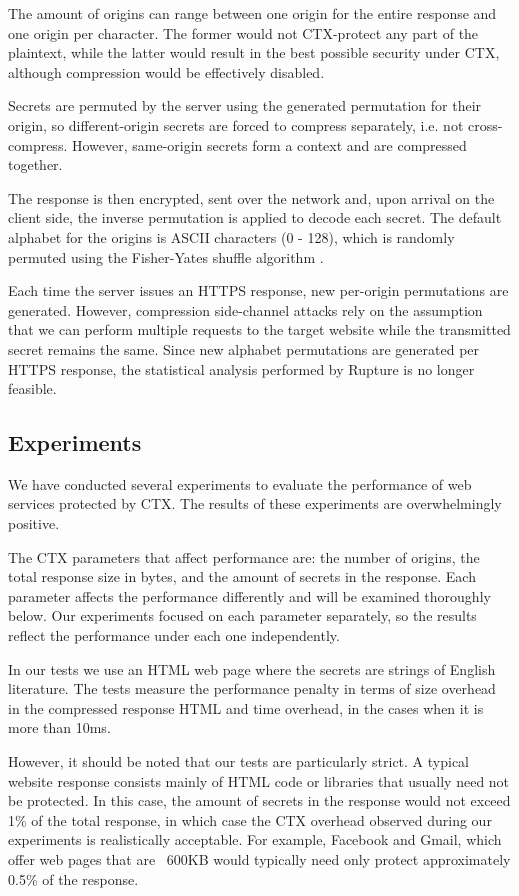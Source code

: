 The amount of origins can range between one origin for the entire response and one
origin per character. The former would not CTX-protect any part of the
plaintext, while the latter would result in the best possible security under
CTX, although compression would be effectively disabled.

Secrets are permuted by the server using the generated permutation for their origin,
so different-origin secrets are forced to compress separately, i.e. not
cross-compress. However, same-origin secrets form a context and are compressed
together.

The response is then encrypted, sent over the network and, upon arrival on the
client side, the inverse permutation is applied to decode each secret. The
default alphabet for the origins is ASCII characters (0 - 128), which is randomly
permuted using the Fisher-Yates shuffle algorithm \cite{fisher1938statistical}.

Each time the server issues an HTTPS response, new per-origin permutations are
generated. However, compression side-channel attacks rely on the assumption that we can
perform multiple requests to the target website while the transmitted secret
remains the same. Since new alphabet permutations are generated per HTTPS
response, the statistical analysis performed by Rupture is no longer feasible.

\subsection{Experiments}\label{subsec:ctx_experiments}

We have conducted several experiments to evaluate the performance of web
services protected by CTX. The results of these experiments are overwhelmingly
positive.

The CTX parameters that affect performance are: the number of origins, the total
response size in bytes, and the amount of secrets in the response. Each
parameter affects the performance differently and will be examined thoroughly
below. Our experiments focused on each parameter separately, so the results
reflect the performance under each one independently.

In our tests we use an HTML web page where the secrets are strings of English
literature. The tests measure the performance penalty in terms of size overhead
in the compressed response HTML and time overhead, in the cases when it is more than 10ms.

However, it should be noted that our tests are particularly strict. A typical
website response consists mainly of HTML code or libraries that usually need not
be protected. In this case, the amount of secrets in the response would not
exceed 1\% of the total response, in which case the CTX overhead observed during
our experiments is realistically acceptable. For example, Facebook and Gmail,
which offer web pages that are ~600KB would typically need only protect approximately
0.5\% of the response.

